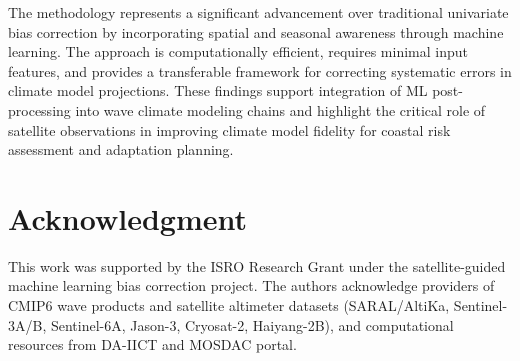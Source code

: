\documentclass[conference]{IEEEtran}
\begin{document}
The methodology represents a significant advancement over traditional univariate bias correction by incorporating spatial and seasonal awareness through machine learning. The approach is computationally efficient, requires minimal input features, and provides a transferable framework for correcting systematic errors in climate model projections. These findings support integration of ML post-processing into wave climate modeling chains and highlight the critical role of satellite observations in improving climate model fidelity for coastal risk assessment and adaptation planning.

\section*{Acknowledgment}

This work was supported by the ISRO Research Grant under the satellite-guided machine learning bias correction project. The authors acknowledge providers of CMIP6 wave products and satellite altimeter datasets (SARAL/AltiKa, Sentinel-3A/B, Sentinel-6A, Jason-3, Cryosat-2, Haiyang-2B), and computational resources from DA-IICT and MOSDAC portal.
\end{document}
